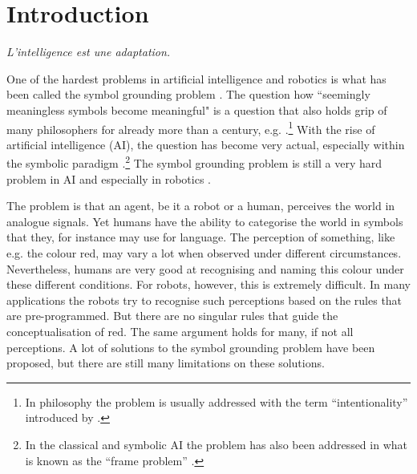 \chapter{Introduction}\label{ch:intro}

\epigraph{\itshape L'intelligence est une adaptation.\\[-2\baselineskip]}{\citep{piaget:1966}}

\noindent One of the hardest problems in artificial intelligence and robotics is what has been called the {\sc symbol grounding problem} \citep{harnad:1990}. The question how ``seemingly meaningless symbols become meaningful" \citep{harnad:1990} is a question that also holds grip of many philosophers for already more than a century, e.g. \citet{bretano:1874,searle:1980,dennett:1991}.\footnote{In philosophy the problem is usually addressed with the term ``intentionality'' introduced by \citet{bretano:1874}.} With the rise of artificial intelligence (AI), the question has become very actual, especially within the symbolic paradigm \citep{newell:1990}.\footnote{In the classical and symbolic AI the problem has also been addressed in what is known as the ``frame problem'' \citep{pylyshyn:1987}.} The symbol grounding problem is still a very hard problem in AI and especially in robotics \citep{pfeiferscheier:1999}.

The problem is that an agent, be it a robot or a human, perceives the world in analogue signals. Yet humans have the ability to categorise the world in symbols that they, for instance may use for language. The perception of something, like e.g. the colour red, may vary a lot when observed under different circumstances. Nevertheless, humans are very good at recognising and naming this colour under these different conditions. For robots, however, this is extremely difficult. In many applications the robots try to recognise such perceptions based on the rules that are pre-programmed. But there are no singular rules that guide the conceptualisation of red. The same argument holds for many, if not all perceptions. A lot of solutions to the symbol grounding problem have been proposed, but there are still many limitations on these solutions. 

